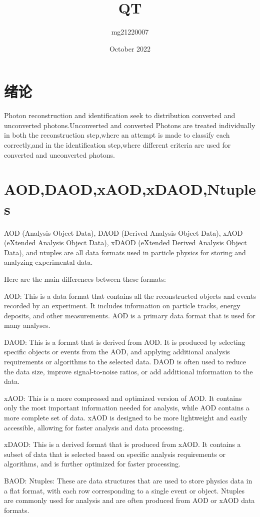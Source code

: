 \documentclass{ctexart}
\title{QT}
\author{mg21220007}
\date{October 2022}
\begin{document}
\tableofcontents%
\maketitle

\section{绪论}
Photon reconstruction and identification seek to  distribution converted and unconverted photons.Unconverted and converted Photons are treated individually in both the reconstruction step,where an attempt is made to classify each correctly,and in the identification step,where different criteria are used for converted and unconverted photons.
\section{AOD,DAOD,xAOD,xDAOD,Ntuples}
AOD (Analysis Object Data), DAOD (Derived Analysis Object Data), xAOD (eXtended Analysis Object Data), xDAOD (eXtended Derived Analysis Object Data), and ntuples are all data formats used in particle physics for storing and analyzing experimental data.

Here are the main differences between these formats:

AOD: This is a data format that contains all the reconstructed objects and events recorded by an experiment. It includes information on particle tracks, energy deposits, and other measurements. AOD is a primary data format that is used for many analyses.

DAOD: This is a format that is derived from AOD. It is produced by selecting specific objects or events from the AOD, and applying additional analysis requirements or algorithms to the selected data. DAOD is often used to reduce the data size, improve signal-to-noise ratios, or add additional information to the data.

xAOD: This is a more compressed and optimized version of AOD. It contains only the most important information needed for analysis, while AOD contains a more complete set of data. xAOD is designed to be more lightweight and easily accessible, allowing for faster analysis and data processing.

xDAOD: This is a derived format that is produced from xAOD. It contains a subset of data that is selected based on specific analysis requirements or algorithms, and is further optimized for faster processing.

BAOD: 
Ntuples: These are data structures that are used to store physics data in a flat format, with each row corresponding to a single event or object. Ntuples are commonly used for analysis and are often produced from AOD or xAOD data formats.
\end{document}
